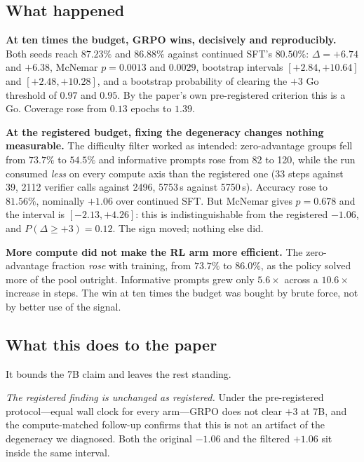

\subsection{What happened}

\textbf{At ten times the budget, GRPO wins, decisively and reproducibly.}
Both seeds reach $87.23\%$ and $86.88\%$ against continued SFT's $80.50\%$:
$\Delta = +6.74$ and $+6.38$, McNemar $p = 0.0013$ and $0.0029$, bootstrap
intervals $[+2.84, +10.64]$ and $[+2.48, +10.28]$, and a bootstrap probability
of clearing the $+3$ Go threshold of $0.97$ and $0.95$. By the paper's own
pre-registered criterion this is a Go. Coverage rose from $0.13$ epochs to
$1.39$.

\textbf{At the registered budget, fixing the degeneracy changes nothing
measurable.} The difficulty filter worked as intended: zero-advantage groups
fell from $73.7\%$ to $54.5\%$ and informative prompts rose from 82 to 120,
while the run consumed \emph{less} on every compute axis than the registered one
(33 steps against 39, 2112 verifier calls against 2496, 5753\,s against
5750\,s). Accuracy rose to $81.56\%$, nominally $+1.06$ over continued SFT. But
McNemar gives $p = 0.678$ and the interval is $[-2.13, +4.26]$: this is
indistinguishable from the registered $-1.06$, and $P(\Delta \geq +3) = 0.12$.
The sign moved; nothing else did.

\textbf{More compute did not make the RL arm more efficient.} The
zero-advantage fraction \emph{rose} with training, from $73.7\%$ to $86.0\%$, as
the policy solved more of the pool outright. Informative prompts grew only
$5.6\times$ across a $10.6\times$ increase in steps. The win at ten times the
budget was bought by brute force, not by better use of the signal.

\subsection{What this does to the paper}

It bounds the 7B claim and leaves the rest standing.

\emph{The registered finding is unchanged as registered.} Under the
pre-registered protocol---equal wall clock for every arm---GRPO does not clear
$+3$ at 7B, and the compute-matched follow-up confirms that this is not an
artifact of the degeneracy we diagnosed. Both the original $-1.06$ and the
filtered $+1.06$ sit inside the same interval.


